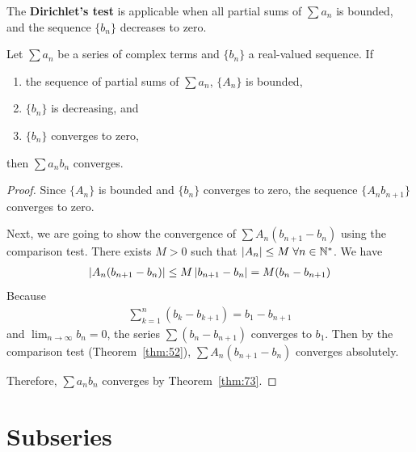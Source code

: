 \documentclass[thmcnt=section, 12pt]{my-elegantbook}
\begin{document}

The \textbf{Dirichlet's test}
is applicable when all partial sums of $\sum a_n$ is bounded,
and the sequence $\{b_n\}$ decreases to zero.

\begin{theorem} \label{thm:74}
    Let $\sum a_n$ be a series of complex terms
    and $\{b_n\}$ a real-valued sequence.
    If
    \begin{enumerate}
        \item the sequence of partial sums of $\sum a_n$,
              $\{A_n\}$ is bounded,
        \item $\{b_n\}$ is decreasing, and
        \item $\{b_n\}$ converges to zero,
    \end{enumerate}
    then $\sum a_n b_n$ converges.
\end{theorem}

\begin{proof}
    Since $\{A_n\}$ is bounded and $\{b_n\}$ converges to zero,
    the sequence $\{A_n b_{n+1}\}$ converges to zero.

    Next, we are going to show the convergence of
    $\sum A_n(b_{n+1} - b_n)$ using the comparison test.
    There exists $M > 0$ such that
    $\left\lvert A_n \right\rvert \leq M \; \forall n \in \mathbb{N}^\ast$.
    We have
    \begin{align*}
        \left\lvert A_n (b_{n+1} - b_n) \right\rvert
        \leq M \left\lvert b_{n+1} - b_{n} \right\rvert
        = M (b_n - b_{n+1})
    \end{align*}
    Because
    \begin{align*}
        \sum_{k=1}^n (b_k - b_{k+1})
        = b_1 - b_{n+1}
    \end{align*}
    and $\lim_{n \to \infty} b_n = 0$,
    the series $\sum (b_n - b_{n+1})$ converges to $b_1$.
    Then by the comparison test (Theorem~\ref{thm:52}),
    $\sum A_n (b_{n+1} - b_{n})$ converges absolutely.

    Therefore, $\sum a_n b_n$ converges by Theorem~\ref{thm:73}.
\end{proof}


\section{Subseries}
\end{document}
